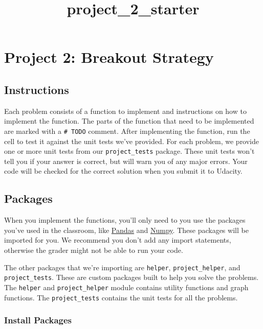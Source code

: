 \documentclass[11pt]{article}
\title{project\_2\_starter}
\begin{document}
    
    
    \maketitle
    
    

    
    \hypertarget{project-2-breakout-strategy}{%
\section{Project 2: Breakout
Strategy}\label{project-2-breakout-strategy}}

\hypertarget{instructions}{%
\subsection{Instructions}\label{instructions}}

Each problem consists of a function to implement and instructions on how
to implement the function. The parts of the function that need to be
implemented are marked with a \texttt{\#\ TODO} comment. After
implementing the function, run the cell to test it against the unit
tests we've provided. For each problem, we provide one or more unit
tests from our \texttt{project\_tests} package. These unit tests won't
tell you if your answer is correct, but will warn you of any major
errors. Your code will be checked for the correct solution when you
submit it to Udacity.

\hypertarget{packages}{%
\subsection{Packages}\label{packages}}

When you implement the functions, you'll only need to you use the
packages you've used in the classroom, like
\href{https://pandas.pydata.org/}{Pandas} and
\href{http://www.numpy.org/}{Numpy}. These packages will be imported for
you. We recommend you don't add any import statements, otherwise the
grader might not be able to run your code.

The other packages that we're importing are \texttt{helper},
\texttt{project\_helper}, and \texttt{project\_tests}. These are custom
packages built to help you solve the problems. The \texttt{helper} and
\texttt{project\_helper} module contains utility functions and graph
functions. The \texttt{project\_tests} contains the unit tests for all
the problems.

\hypertarget{install-packages}{%
\subsubsection{Install Packages}\label{install-packages}}
\end{document}
